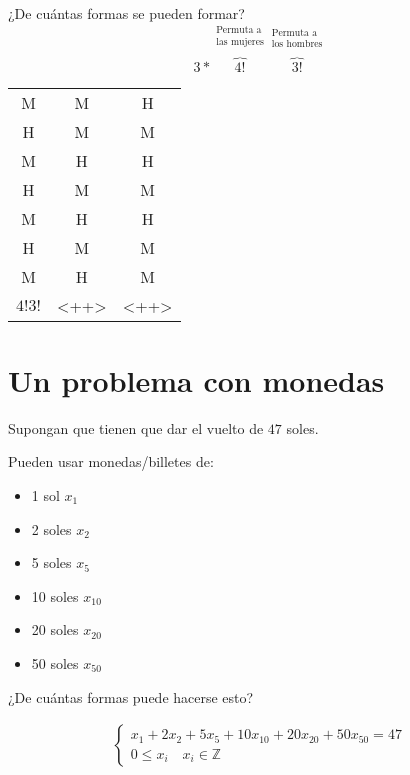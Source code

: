 \documentclass[../main.tex]{subfiles}
\begin{document}
¿De cuántas formas se pueden formar?
\[
	3*
	\overbrace
	{
		4!
	}^
	{
		\substack
		{
			\text{Permuta a}\\
			\text{las mujeres}\\
		}
	}
	\overbrace
	{
		3!
	}^
	{
		\substack
		{
			\text{Permuta a}\\
			\text{los hombres}\\
		}
	}
\]
\begin{center}
	\begin{tabular}{ccc}
		M & M & H\\
		H & M & M\\
		M & H & H\\
		H & M & M\\
		M & H & H\\
		H & M & M\\
		M & H & M\\
		$4!3!$ & <++> & <++>
	\end{tabular}
\end{center}



\section{Un problema con monedas}%
\label{sec:un_problema_con_monedas}

Supongan que tienen que dar el vuelto de $47$ soles.

Pueden usar monedas/billetes de:
\begin{itemize}
	\item 1 sol $x_1$
	\item 2 soles $x_2$
	\item 5 soles $x_5$
	\item 10 soles $x_{10}$
	\item 20 soles $x_{20}$
	\item 50 soles $x_{50}$
\end{itemize}

¿De cuántas formas puede hacerse esto?

\begin{gather*}
	\begin{cases}
		x_1+2x_2+5x_5+10x_{10}+20x_{20}+50x_{50} = 47\\
		0 \leq x_i \quad x_i \in \mathbb{Z}
	\end{cases}
\end{gather*}
\end{document}
